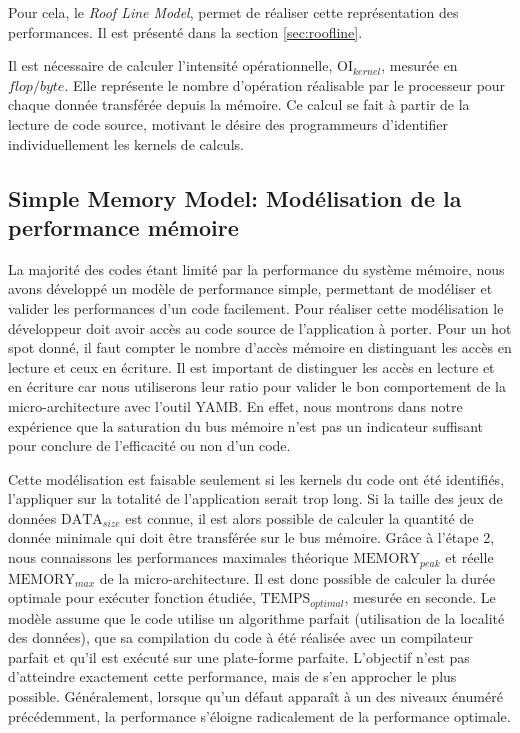 Pour cela, le \textit{Roof Line Model}, permet de réaliser cette représentation des performances. Il est présenté dans la section \ref{sec:roofline}. 

Il est nécessaire de calculer l'intensité opérationnelle, $\text{OI}_{kernel}$, mesurée en $flop/byte$. Elle représente le nombre d'opération réalisable par le processeur pour chaque donnée transférée depuis la mémoire. Ce calcul se fait à partir de la lecture de code source, motivant le désire des programmeurs d'identifier individuellement les kernels de calculs. 


\subsection{Simple Memory Model: Modélisation de la performance mémoire} \label{sec:smm}

La majorité des codes étant limité par la performance du système mémoire, nous avons développé un modèle de performance simple, permettant de modéliser et valider les performances d'un code facilement. Pour réaliser cette modélisation le développeur doit avoir accès au code source de l'application à porter. Pour un hot spot donné, il faut compter le nombre d'accès mémoire en distinguant les accès en lecture et ceux en écriture. Il est important de distinguer les accès en lecture et en écriture car nous utiliserons leur ratio pour valider le bon comportement de la micro-architecture avec l'outil YAMB. En effet, nous montrons dans notre expérience que la saturation du bus mémoire n'est pas un indicateur suffisant pour conclure de l'efficacité ou non d'un code.

Cette modélisation est faisable seulement si les kernels du code ont été identifiés, l'appliquer sur la totalité de l'application serait trop long. Si la taille des jeux de données $\text{DATA}_{size}$ est connue, il est alors possible de calculer la quantité de donnée minimale qui doit être transférée sur le bus mémoire. Grâce à l'étape 2, nous connaissons les performances maximales théorique $\text{MEMORY}_{peak}$ et réelle $\text{MEMORY}_{max}$ de la micro-architecture. Il est donc possible de calculer la durée optimale pour exécuter fonction étudiée, $\text{TEMPS}_{optimal}$, mesurée en seconde. Le modèle assume que le code utilise un algorithme parfait (utilisation de la localité des données), que sa compilation du code à été réalisée avec un compilateur parfait et qu'il est exécuté sur une plate-forme parfaite. L'objectif n'est pas d'atteindre exactement cette performance, mais de s'en approcher le plus possible. Généralement, lorsque qu'un défaut apparaît à un des niveaux énuméré précédemment, la performance s'éloigne radicalement de la performance optimale.

